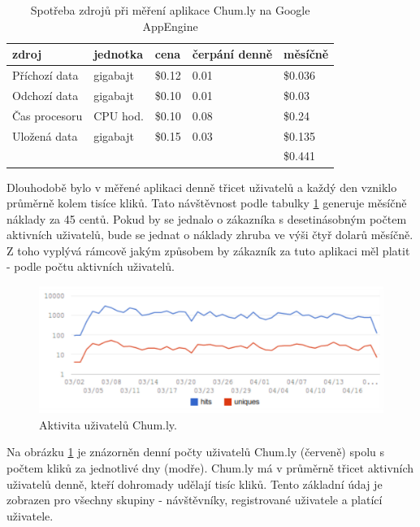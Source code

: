 \documentclass[bc,male,java,dept456]{diploma}						%
\begin{document}
\bigskip


\begin{table}
	\centering
	
\begin{tabular}{p{3.25cm} p{2.5cm} p{2cm} p{2.5cm} p{2cm}}
zdroj					& jednotka & cena		& čerpání denně	& měsíčně \\
\hline
Příchozí data			& gigabajt				& \$0.12	& 0.01			& \$0.036 	\\
Odchozí data			& gigabajt				& \$0.10	& 0.01			& \$0.03	\\
Čas procesoru			& CPU hod.				& \$0.10	& 0.08 			& \$0.24	\\
Uložená data			& gigabajt				& \$0.15	& 0.03			& \$0.135	\\
\hline
						& 		 				& 			& 				& \$0.441 \\
\end{tabular}
	
	\caption{Spotřeba zdrojů při měření aplikace Chum.ly na Google AppEngine}	
	\label{tab:consumption}
\end{table}


Dlouhodobě bylo v měřené aplikaci denně třicet uživatelů a každý den vzniklo prů\-měr\-ně kolem tisíce kliků. Tato návštěvnost podle tabulky \ref{tab:consumption} generuje měsíčně náklady za 45 centů. Pokud by se jednalo o zákazníka s desetinásobným počtem aktivních uživatelů, bude se jednat o náklady zhruba ve výši čtyř dolarů měsíčně. Z toho vyplývá rámcově jakým způsobem by zákazník za tuto aplikaci měl platit - podle počtu aktivních uživatelů.

\begin{figure}[h]
	\centering
	\includegraphics[width=13.45cm]{img/ud_active_users.pdf}
	\caption{Aktivita uživatelů Chum.ly.}
	\label{img:chumly_active_users}
\end{figure}


Na obrázku \ref{img:chumly_active_users} je znázorněn denní počty uživatelů Chum.ly (červeně) spolu s počtem kliků za jednotlivé dny (modře). Chum.ly má v průměrně třicet aktivních uživatelů denně, kteří dohromady udělají tisíc kliků. Tento základní údaj je zobrazen pro všechny skupiny - návštěvníky, registrované uživatele a platící uživatele.  
\end{document}
